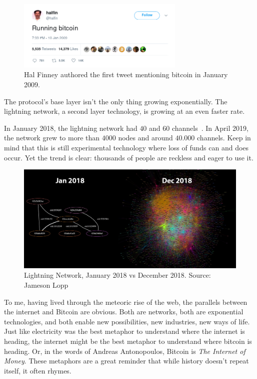 \begin{figure}
  \centering
  \includegraphics[width=8cm]{assets/images/running-bitcoin.png}
  \caption{Hal Finney authored the first tweet mentioning bitcoin in January 2009.}
  \label{fig:running-bitcoin}
\end{figure}

The protocol's base layer isn't the only thing growing exponentially.
The lightning network, a second layer technology, is growing at an even
faster rate.

In January 2018, the lightning network had $40$ and $60$ channels~\cite{web:lightning-nodes}.
In April 2019, the network grew to more than $4000$ nodes and around
$40.000$ channels. Keep in mind that this is still experimental technology
where loss of funds can and does occur. Yet the trend is clear:
thousands of people are reckless and eager to use it.

\begin{figure}
  \includegraphics{assets/images/lnd-growth-lopp-black.png}
  \caption{Lightning Network, January 2018 vs December 2018. Source: Jameson Lopp}
  \label{fig:lnd-growth-lopp-black.png}
\end{figure}

To me, having lived through the meteoric rise of the web, the parallels
between the internet and Bitcoin are obvious. Both are networks, both
are exponential technologies, and both enable new possibilities, new
industries, new ways of life. Just like electricity was the best
metaphor to understand where the internet is heading, the internet might
be the best metaphor to understand where bitcoin is heading. Or, in the
words of Andreas Antonopoulos, Bitcoin is \textit{The Internet of Money}.
These metaphors are a great reminder that while history doesn't repeat
itself, it often rhymes.

